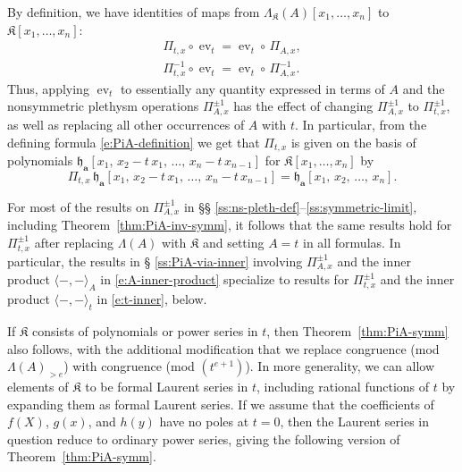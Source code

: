 \documentclass[12pt]{amsart}
\theoremstyle{definition}
\theoremstyle{remark}
\newcommand{\aA}{{\mathbf a}}
\newcommand{\fh}{{\mathfrak h}}
\newcommand{\Kfrak}{{\mathfrak K}}
\DeclareMathOperator{\ev}{ev}
\begin{document}
By definition, we have identities of maps from $\Lambda _{\Kfrak
}(A)[x_{1},\ldots,x_{n}]$ to $\Kfrak [x_{1},\ldots,x_{n}]$:
\begin{equation}\label{e:Pit-PiA}
\begin{gathered}
\Pi _{t,x} \circ \ev _{t} = \ev _{t} \circ \, \Pi _{A,x},\\
\Pi _{t,x}^{-1} \circ \ev _{t} = \ev _{t} \circ \, \Pi _{A,x}^{-1}.
\end{gathered}
\end{equation}
Thus, applying $\ev _{t}$ to
essentially any quantity expressed in terms of $A$ and the
nonsymmetric plethysm operations $\Pi _{A,x}^{\pm 1}$ has the effect
of changing $\Pi _{A,x}^{\pm 1}$ to $\Pi _{t,x}^{\pm 1}$, as well as
replacing all other occurrences of $A$ with $t$.  In particular,
from the defining formula \eqref{e:PiA-definition} we get that $\Pi
_{t,x}$ is given on the basis of polynomials $\fh_{\aA }[x_{1},\,
x_{2}-t\, x_{1},\, \ldots,\, x_{n}-t\, x_{n-1}]$ for $\Kfrak
[x_{1},\ldots,x_{n}]$ by
\begin{equation}\label{e:Pit-form-of-definition}
\Pi _{t,x} \, \fh_{\aA }[x_{1},\, x_{2}-t\, x_{1},\, \ldots,\, x_{n}-t\,
x_{n-1}] = \fh_{\aA }[x_{1},\, x_{2},\, \ldots,\, x_{n}].
\end{equation}

For most of the results on $\Pi _{A,x}^{\pm 1}$ in \S \S
\ref{ss:ns-pleth-def}--\ref{ss:symmetric-limit}, including
Theorem~\ref{thm:PiA-inv-symm}, it follows that the same results hold
for $\Pi _{t,x}^{\pm 1}$ after replacing $\Lambda (A)$ with $\Kfrak $
and setting $A=t$ in all formulas.  In particular, the results in \S
\ref{ss:PiA-via-inner} involving $\Pi _{A,x}^{\pm 1}$ and the inner
product $\langle -,- \rangle _{A}$ in \eqref{e:A-inner-product}
specialize to results for $\Pi _{t,x}^{\pm 1}$ and the inner product
$\langle -,- \rangle _{t}$ in \eqref{e:t-inner}, below.

If $\Kfrak $ consists of polynomials or power series in $t$, then
Theorem~\ref{thm:PiA-symm} also follows, with the additional
modification that we replace congruence (mod $\Lambda (A)_{>e}$) with
congruence (mod $(t^{e+1})$).  In more generality, we can allow
elements of $\Kfrak $ to be formal Laurent series in $t$, including
rational functions of $t$ by expanding them as formal Laurent series.
If we assume that the coefficients of $f(X)$, $g(x)$, and $h(y)$ have
no poles at $t=0$, then the Laurent series in question reduce to
ordinary power series, giving the following version of
Theorem~\ref{thm:PiA-symm}.
\end{document}
